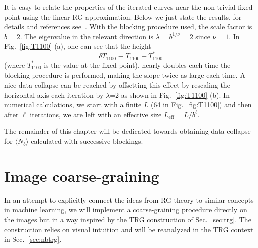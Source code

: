 \documentclass[../main.tex]{subfiles}
\begin{document}
%
It is easy to relate the properties of the iterated curves near the non-trivial
fixed point using the linear RG approximation.
%
Below we just state the results, for details and references see~\cite{prb87}.
With the blocking procedure used, the scale factor is $b=2$.
%
The eigenvalue in the relevant direction is $\lambda=b^{1/\nu}=2$ since
$\nu=1$. In Fig.~\ref{fig:T1100} (a), one can see that the height
%
\begin{equation}
    \delta T_{1100} \equiv T_{1100} - T_{1100}^{*}
\end{equation}
%
(where $T_{1100}^{*}$ is the value at the fixed point), nearly doubles each
time the blocking procedure is performed, making the slope twice as large each
time.
A nice data collapse can be reached by offsetting this effect by rescaling the
horizontal axis each iteration by $\lambda$=2 as shown in Fig.~\ref{fig:T1100}
(b).
%
In numerical calculations, we start with a finite $L$ (64 in
Fig.~\ref{fig:T1100}) and then after $\ell$ iterations, we are left with an
effective size $L_{\mathrm{eff}}=L/b^\ell$. 

The remainder of this chapter will be dedicated towards obtaining data collapse
for $\langle N_b \rangle$ calculated with successive blockings.

\section{Image coarse-graining}%
\label{sec:rgimages}
In an attempt to explicitly connect the ideas from RG theory to similar
concepts in machine learning, we will implement a coarse-graining procedure
directly on the images but in a way inspired by the TRG construction of
Sec.~\ref{sec:trg}.
%
The construction relies on visual intuition and will be reanalyzed in the TRG
context in Sec.~\ref{sec:nbtrg}.
\end{document}
